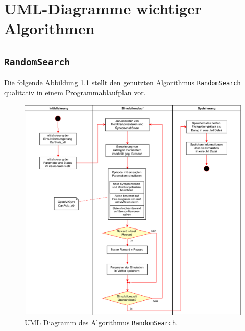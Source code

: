 \appendix
%
\chapter{UML-Diagramme wichtiger Algorithmen}
\label{app:UML}
%

	\section{\texttt{RandomSearch}}
	\label{app:UML_RS}
		Die folgende Abbildung \ref{fig:uml_rs} stellt den genutzten Algorithmus \texttt{RandomSearch} qualitativ in einem Programmablaufplan vor.
		\begin{figure}[H]
			\centering
			\includegraphics[width=14cm]{figures/appendix/uml_rs.pdf}
			\caption{UML Diagramm des Algorithmus \texttt{RandomSearch}.}
			\label{fig:uml_rs}
		\end{figure}
	
